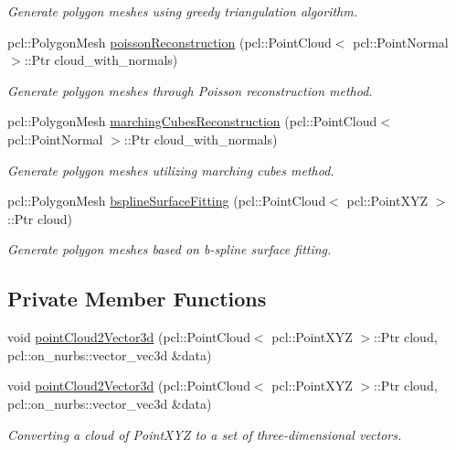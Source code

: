 \begin{DoxyCompactItemize}
\begin{DoxyCompactList}\small\item\em Generate polygon meshes using greedy triangulation algorithm. \end{DoxyCompactList}\item 
pcl\+::\+Polygon\+Mesh \hyperlink{classhull__abstraction_1_1_reconstructor_a9b7e8bda9c001e4d2eab2712e2b57f04}{poisson\+Reconstruction} (pcl\+::\+Point\+Cloud$<$ pcl\+::\+Point\+Normal $>$\+::Ptr cloud\+\_\+with\+\_\+normals)
\begin{DoxyCompactList}\small\item\em Generate polygon meshes through Poisson reconstruction method. \end{DoxyCompactList}\item 
pcl\+::\+Polygon\+Mesh \hyperlink{classhull__abstraction_1_1_reconstructor_a98e633c1c4e98926b0e1beda2e867524}{marching\+Cubes\+Reconstruction} (pcl\+::\+Point\+Cloud$<$ pcl\+::\+Point\+Normal $>$\+::Ptr cloud\+\_\+with\+\_\+normals)
\begin{DoxyCompactList}\small\item\em Generate polygon meshes utilizing marching cubes method. \end{DoxyCompactList}\item 
pcl\+::\+Polygon\+Mesh \hyperlink{classhull__abstraction_1_1_reconstructor_a531c5dc53b28b4f1e48a318db1acea90}{bspline\+Surface\+Fitting} (pcl\+::\+Point\+Cloud$<$ pcl\+::\+Point\+X\+YZ $>$\+::Ptr cloud)
\begin{DoxyCompactList}\small\item\em Generate polygon meshes based on b-\/spline surface fitting. \end{DoxyCompactList}\end{DoxyCompactItemize}
\subsection*{Private Member Functions}
\begin{DoxyCompactItemize}
\item 
void \hyperlink{classhull__abstraction_1_1_reconstructor_a484b377810bba7e42d39c47ed3725941}{point\+Cloud2\+Vector3d} (pcl\+::\+Point\+Cloud$<$ pcl\+::\+Point\+X\+YZ $>$\+::Ptr cloud, pcl\+::on\+\_\+nurbs\+::vector\+\_\+vec3d \&data)
\item 
void \hyperlink{classhull__abstraction_1_1_reconstructor_a484b377810bba7e42d39c47ed3725941}{point\+Cloud2\+Vector3d} (pcl\+::\+Point\+Cloud$<$ pcl\+::\+Point\+X\+YZ $>$\+::Ptr cloud, pcl\+::on\+\_\+nurbs\+::vector\+\_\+vec3d \&data)
\begin{DoxyCompactList}\small\item\em Converting a cloud of Point\+X\+YZ to a set of three-\/dimensional vectors. \end{DoxyCompactList}\end{DoxyCompactItemize}
